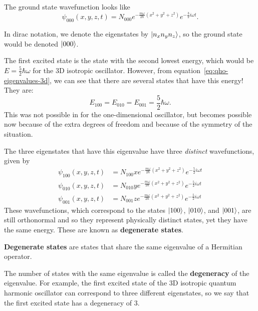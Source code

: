 \documentclass[../quantum_mechanics.tex]{subfiles}
\begin{document}
            The ground state wavefunction looks like
            \begin{equation}
                \psi_{000}(x,y,z,t)=N_{000}e^{-\frac{m\omega}{2\hbar}(x^2+y^2+z^2)}e^{-\frac{3}{2}i\omega t}.
            \end{equation}

            In dirac notation, we denote the eigenstates by $\lvert n_xn_yn_z\rangle$, so the ground state would be denoted $\lvert000\rangle$.

            The first excited state is the state with the second lowest energy, which would be $E=\frac{5}{2}\hbar\omega$ for the 3D isotropic oscillator.
            However, from equation~\ref{eq:qho-eigenvalues-3d}, we can see that there are several states that have this energy!
            They are:
            \begin{equation}
                E_{100}=E_{010}=E_{001}=\frac{5}{2}\hbar\omega.
            \end{equation}
            This was not possible in for the one-dimensional oscillator, but becomes possible now because of the extra degrees of freedom and because of the symmetry of the situation.

            The three eigenstates that have this eigenvalue have three \textit{distinct} wavefunctions, given by
            \begin{align}
                \psi_{100}(x,y,z,t)&=N_{100}xe^{-\frac{m\omega}{2\hbar}(x^2+y^2+z^2)}e^{-\frac{5}{2}i\omega t}\\
                \psi_{010}(x,y,z,t)&=N_{010}ye^{-\frac{m\omega}{2\hbar}(x^2+y^2+z^2)}e^{-\frac{5}{2}i\omega t}\\
                \psi_{001}(x,y,z,t)&=N_{001}ze^{-\frac{m\omega}{2\hbar}(x^2+y^2+z^2)}e^{-\frac{5}{2}i\omega t}
            \end{align}
            These wavefunctions, which correspond to the states $\lvert100\rangle$, $\lvert010\rangle$, and $\lvert001\rangle$, are still orthonormal and so they represent physically distinct states, yet they have the same energy.
            These are known as \textbf{degenerate states}.
            \begin{definition}
                \textbf{Degenerate states} are states that share the same eigenvalue of a Hermitian operator.

                The number of states with the same eigenvalue is called the \textbf{degeneracy} of the eigenvalue.
                For example, the first excited state of the 3D isotropic quantum harmonic oscillator can correspond to three different eigenstates, so we say that the first excited state has a degeneracy of 3.
            \end{definition}


\end{document}
